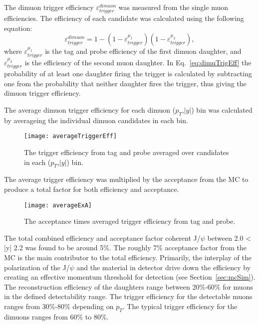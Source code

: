       The dimuon trigger efficiency $\varepsilon^{dimuon}_{trigger}$ was measured
        from the single muon efficiencies. 
      The efficiency of each candidate was calculated using the following
        equation:
      \begin{equation}
        \label{eq:dimuTrigEff}
        \varepsilon^{dimuon}_{trigger}=1-(1-\varepsilon_{trigger}^{\mu_{1}})(1-\varepsilon_{trigger}^{\mu_{2}}),
      \end{equation}
      where $\varepsilon_{trigger}^{\mu_{1}}$ is the tag and probe efficiency
        of the first dimuon daughter, and $\varepsilon_{trigger}^{\mu_{2}}$ is
        the efficiency of the second muon daughter. 
      In Eq.~\ref{eq:dimuTrigEff} the probability of at least one daughter
        firing the trigger is calculated by subtracting one from the
        probability that neither daughter fires the trigger,
        thus giving the dimuon trigger efficiency. 

      The average dimuon trigger efficiency for each dimuon ($p_{T}$,$|y|$) bin
        was calculated by averageing the individual dimuon candidates in each
        bin. 
      \begin{figure}[!Hhbt]
        \centering
        \texttt{[image: averageTriggerEff]}
        \caption{The trigger efficiency from tag and probe averaged over candidates
          in each ($p_{T}$,$|y|$) bin.}
        \label{fig:avTrigEffCo}
      \end{figure}
      The average trigger efficiency was multiplied by the acceptance from the MC 
        to produce a total factor for both efficiency and acceptance. 
      \begin{figure}[!Hhtb]
        \centering
        \texttt{[image: averageExA]}
        \caption{The acceptance times averaged trigger efficiency from tag and 
          probe.}
        \label{fig:avAccEff}
      \end{figure}

      The total combined efficiency and acceptance factor coherent J/$\psi$ 
        between 2.0 < |y| 2.2 was found to be around 5\%.
      The roughly 7\% acceptance factor from the MC is the main contributor
        to the total efficiency. 
      Primarily, the interplay of the polarization of the J/$\psi$ and
        the material in detector drive down the efficiency by creating an 
        effective momentum threshold for detection (see 
        Section~\ref{sec:mcSim}).
      The reconstruction efficiency of the daughters range between 
        20\%-60\% for muons in the defined detectability range. 
      The trigger efficiency for the detectable muons ranges from 30\%-80\% 
        depending on $p_{T}$. 
      The typical trigger efficiency for the dimuons ranges from 60\% to 80\%.

